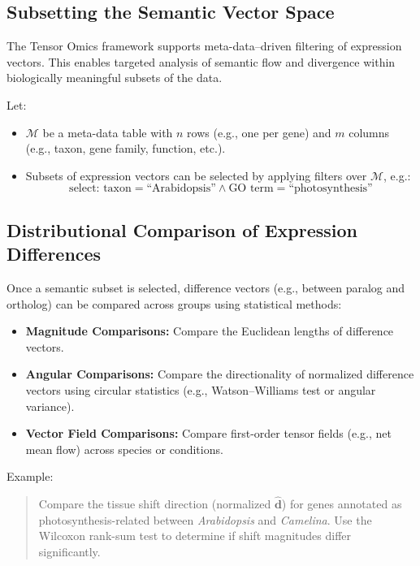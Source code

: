 \documentclass[11pt]{article}
\begin{document}
\subsection{Subsetting the Semantic Vector Space}

The Tensor Omics framework supports meta-data–driven filtering of expression vectors. This enables targeted analysis of semantic flow and divergence within biologically meaningful subsets of the data.

Let:
\begin{itemize}[leftmargin=1.5em]
    \item $\mathcal{M}$ be a meta-data table with $n$ rows (e.g., one per gene) and $m$ columns (e.g., taxon, gene family, function, etc.).
    \item Subsets of expression vectors can be selected by applying filters over $\mathcal{M}$, e.g.:
    \[
    \text{select: taxon} = \text{``Arabidopsis''} \land \text{GO term} = \text{``photosynthesis''}
    \]
\end{itemize}

\subsection{Distributional Comparison of Expression Differences}

Once a semantic subset is selected, difference vectors (e.g., between paralog and ortholog) can be compared across groups using statistical methods:

\begin{itemize}[leftmargin=1.5em]
    \item \textbf{Magnitude Comparisons:} Compare the Euclidean lengths of difference vectors.
    \item \textbf{Angular Comparisons:} Compare the directionality of normalized difference vectors using circular statistics (e.g., Watson–Williams test or angular variance).
    \item \textbf{Vector Field Comparisons:} Compare first-order tensor fields (e.g., net mean flow) across species or conditions.
\end{itemize}

Example:
\begin{quote}
Compare the tissue shift direction (normalized $\hat{\mathbf{d}}$) for genes annotated as photosynthesis-related between \textit{Arabidopsis} and \textit{Camelina}. Use the Wilcoxon rank-sum test to determine if shift magnitudes differ significantly.
\end{quote}
\end{document}
